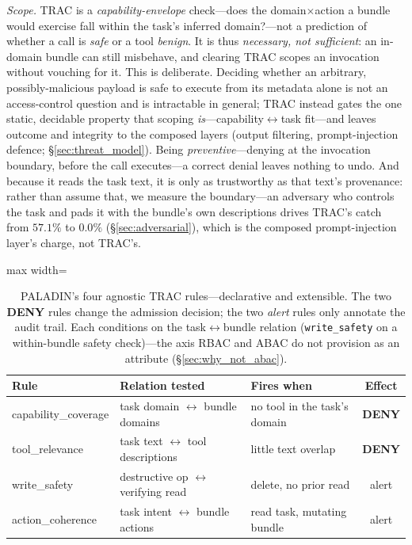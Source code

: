 \documentclass[sigconf,review,anonymous]{acmart}
\begin{document}
\emph{Scope.} TRAC is a \emph{capability-envelope} check---does the domain$\times$action a bundle would exercise fall within the task's inferred domain?---not a prediction of whether a call is \emph{safe} or a tool \emph{benign}. It is thus \emph{necessary, not sufficient}: an in-domain bundle can still misbehave, and clearing TRAC scopes an invocation without vouching for it. This is deliberate. Deciding whether an arbitrary, possibly-malicious payload is safe to execute from its metadata alone is not an access-control question and is intractable in general; TRAC instead gates the one static, decidable property that scoping \emph{is}---capability$\leftrightarrow$task fit---and leaves outcome and integrity to the composed layers (output filtering, prompt-injection defence; \S\ref{sec:threat_model}). Being \emph{preventive}---denying at the invocation boundary, before the call executes---a correct denial leaves nothing to undo. And because it reads the task text, it is only as trustworthy as that text's provenance: rather than assume that, we measure the boundary---an adversary who controls the task and pads it with the bundle's own descriptions drives TRAC's catch from $57.1\%$ to $0.0\%$ (\S\ref{sec:adversarial}), which is the composed prompt-injection layer's charge, not TRAC's.

\begin{table}[!t]
\centering
\caption{PALADIN's four agnostic TRAC rules---declarative and extensible. The two \textbf{DENY} rules change the admission decision; the two \emph{alert} rules only annotate the audit trail. Each conditions on the task$\leftrightarrow$bundle relation (\texttt{write\_safety} on a within-bundle safety check)---the axis RBAC and ABAC do not provision as an attribute (\S\ref{sec:why_not_abac}).}
\label{tab:trac_rules}
\footnotesize
\begin{adjustbox}{max width=\columnwidth}
\begin{tabular}{@{}lllc@{}}
\toprule
\textbf{Rule} & \textbf{Relation tested} & \textbf{Fires when} & \textbf{Effect} \\
\midrule
capability\_coverage & task domain $\leftrightarrow$ bundle domains & no tool in the task's domain & \textbf{DENY} \\
tool\_relevance      & task text $\leftrightarrow$ tool descriptions & little text overlap & \textbf{DENY} \\
write\_safety        & destructive op $\leftrightarrow$ verifying read & delete, no prior read & alert \\
action\_coherence    & task intent $\leftrightarrow$ bundle actions & read task, mutating bundle & alert \\
\bottomrule
\end{tabular}
\end{adjustbox}
\end{table}
\end{document}
